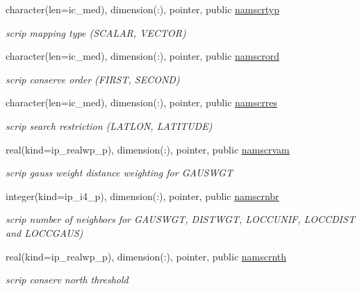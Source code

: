 \begin{DoxyCompactItemize}
character(len=ic\+\_\+med), dimension(\+:), pointer, public \hyperlink{namespacemod__oasis__namcouple_a8ddbaabd22bbf485888b1df5f3578909}{namscrtyp}
\begin{DoxyCompactList}\small\item\em scrip mapping type (S\+C\+A\+L\+AR, V\+E\+C\+T\+OR) \end{DoxyCompactList}\item 
character(len=ic\+\_\+med), dimension(\+:), pointer, public \hyperlink{namespacemod__oasis__namcouple_ac881ced105604879ada860fabd677481}{namscrord}
\begin{DoxyCompactList}\small\item\em scrip conserve order (F\+I\+R\+ST, S\+E\+C\+O\+ND) \end{DoxyCompactList}\item 
character(len=ic\+\_\+med), dimension(\+:), pointer, public \hyperlink{namespacemod__oasis__namcouple_a6a95ddbbbc615e0257d93d05e4546239}{namscrres}
\begin{DoxyCompactList}\small\item\em scrip search restriction (L\+A\+T\+L\+ON, L\+A\+T\+I\+T\+U\+DE) \end{DoxyCompactList}\item 
real(kind=ip\+\_\+realwp\+\_\+p), dimension(\+:), pointer, public \hyperlink{namespacemod__oasis__namcouple_a45b410743ce74a9824d44b329ba323ba}{namscrvam}
\begin{DoxyCompactList}\small\item\em scrip gauss weight distance weighting for G\+A\+U\+S\+W\+GT \end{DoxyCompactList}\item 
integer(kind=ip\+\_\+i4\+\_\+p), dimension(\+:), pointer, public \hyperlink{namespacemod__oasis__namcouple_a20d614468823744b82118ee8cf2df852}{namscrnbr}
\begin{DoxyCompactList}\small\item\em scrip number of neighbors for G\+A\+U\+S\+W\+GT, D\+I\+S\+T\+W\+GT, L\+O\+C\+C\+U\+N\+IF, L\+O\+C\+C\+D\+I\+ST and L\+O\+C\+C\+G\+A\+US) \end{DoxyCompactList}\item 
real(kind=ip\+\_\+realwp\+\_\+p), dimension(\+:), pointer, public \hyperlink{namespacemod__oasis__namcouple_a3118551c00a0292c1af684ece57cc8f0}{namscrnth}
\begin{DoxyCompactList}\small\item\em scrip conserv north threshold \end{DoxyCompactList}\item 

\end{DoxyCompactItemize}
